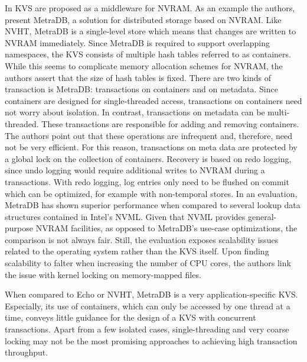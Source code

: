 In \cite{marmol2016nonvolatile} KVS are proposed as a middleware for NVRAM. As
an example the authors, present MetraDB, a solution for distributed storage
based on NVRAM. Like NVHT, MetraDB is a single-level store which means that
changes are written to NVRAM immediately. Since MetraDB is required to support
overlapping namespaces, the KVS consists of multiple hash tables referred to as
containers. While this seems to complicate memory allocation schemes for NVRAM,
the authors assert that the size of hash tables is fixed. There are two kinds of
transaction is MetraDB: transactions on containers and on metadata. Since
containers are designed for single-threaded access, transactions on containers
need not worry about isolation. In contrast, transactions on metadata can be
multi-threaded. These transactions are responsible for adding and removing
containers. The authors point out that these operations are infrequent and,
therefore, need not be very efficient. For this reason, transactions on meta
data are protected by a global lock on the collection of containers. Recovery is
based on redo logging, since undo logging would require additional writes to
NVRAM during a transactions. With redo logging, log entries only need to be
flushed on commit which can be optimized, for example with non-temporal stores.
In an evaluation, MetraDB has shown superior performance when compared to
several lookup data structures contained in Intel's NVML. Given that NVML
provides general-purpose NVRAM facilities, as opposed to MetraDB's use-case
optimizations, the comparison is not always fair. Still, the evaluation exposes
scalability issues related to the operating system rather than the KVS itself.
Upon finding scalability to falter when increasing the number of CPU cores, the
authors link the issue with kernel locking on memory-mapped files.

When compared to Echo or NVHT, MetraDB is a very application-specific KVS.
Especially, its use of containers, which can only be accessed by one thread at a
time, conveys little guidance for the design of a KVS with concurrent
transactions. Apart from a few isolated cases, single-threading and very coarse
locking may not be the most promising approaches to achieving high transaction
throughput.

